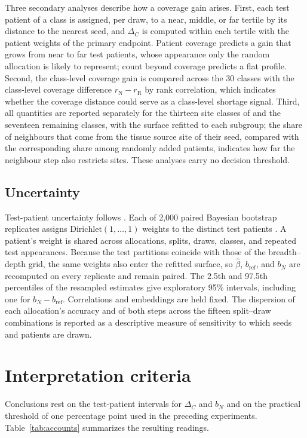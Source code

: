 \documentclass[11pt]{article}
\begin{document}
Three secondary analyses describe how a coverage gain arises. First, each test patient of a class is assigned, per draw, to a near, middle, or far tertile by its distance to the nearest seed, and $\Delta_C$ is computed within each tertile with the patient weights of the primary endpoint. Patient coverage predicts a gain that grows from near to far test patients, whose appearance only the random allocation is likely to represent; count beyond coverage predicts a flat profile. Second, the class-level coverage gain is compared across the 30 classes with the class-level coverage difference $r_{\mathrm N}-r_{\mathrm R}$ by rank correlation, which indicates whether the coverage distance could serve as a class-level shortage signal. Third, all quantities are reported separately for the thirteen site classes of \citet{queisler2026siteCoverage} and the seventeen remaining classes, with the surface refitted to each subgroup; the share of neighbours that come from the tissue source site of their seed, compared with the corresponding share among randomly added patients, indicates how far the neighbour step also restricts sites. These analyses carry no decision threshold.

\subsection{Uncertainty}
\label{sec:uncertainty}
Test-patient uncertainty follows \citet{queisler2026effectiveSupport}. Each of 2,000 paired Bayesian bootstrap replicates assigns $\mathrm{Dirichlet}(1,\ldots,1)$ weights to the distinct test patients \citep{rubin1981bayesian}. A patient's weight is shared across allocations, splits, draws, classes, and repeated test appearances. Because the test partitions coincide with those of the breadth--depth grid, the same weights also enter the refitted surface, so $\hat\beta$, $b_{\mathrm{ref}}$, and $b_N$ are recomputed on every replicate and remain paired. The 2.5th and 97.5th percentiles of the resampled estimates give exploratory 95\% intervals, including one for $b_N-b_{\mathrm{ref}}$. Correlations and embeddings are held fixed. The dispersion of each allocation's accuracy and of both steps across the fifteen split--draw combinations is reported as a descriptive measure of sensitivity to which seeds and patients are drawn.

\section{Interpretation criteria}
\label{sec:interpretation}
Conclusions rest on the test-patient intervals for $\Delta_C$ and $b_N$ and on the practical threshold of one percentage point used in the preceding experiments. Table~\ref{tab:accounts} summarizes the resulting readings.
\end{document}
